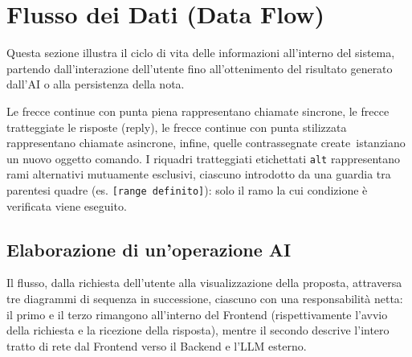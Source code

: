 \section{Flusso dei Dati (Data Flow)}
Questa sezione illustra il ciclo di vita delle informazioni all'interno del sistema, partendo dall'interazione dell'utente fino all'ottenimento del risultato generato dall'AI o alla persistenza della nota. 

Le frecce continue con punta piena rappresentano chiamate sincrone, le frecce tratteggiate le risposte (reply), le frecce continue con punta stilizzata rappresentano chiamate asincrone, infine, quelle contrassegnate \guillemotleft create\guillemotright\ istanziano un nuovo oggetto comando. I riquadri tratteggiati etichettati \texttt{alt} rappresentano rami alternativi mutuamente esclusivi, ciascuno introdotto da una guardia tra parentesi quadre (es. \texttt{[range definito]}): solo il ramo la cui condizione è verificata viene eseguito.
\subsection{Elaborazione di un'operazione AI}
Il flusso, dalla richiesta dell’utente alla visualizzazione della proposta, attraversa tre diagrammi di sequenza in successione, ciascuno con una responsabilità netta: il primo e il terzo rimangono all’interno del Frontend (rispettivamente l’avvio della richiesta e la ricezione della risposta), mentre il secondo descrive l’intero tratto di rete dal Frontend verso il Backend e l’LLM esterno.

